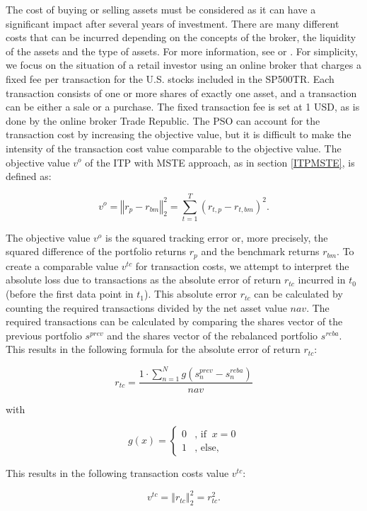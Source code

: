 \documentclass[
  oneside, a4paper, 12pt, openany]{book}
\theoremstyle{definition}
\theoremstyle{definition}
\theoremstyle{definition}
\theoremstyle{definition}
\theoremstyle{remark}
\begin{document}
The cost of buying or selling assets must be considered as it can have a significant impact after several years of investment. There are many different costs that can be incurred depending on the concepts of the broker, the liquidity of the assets and the type of assets. For more information, see \citep{AkGa2022} or \citep{NySe2022}. For simplicity, we focus on the situation of a retail investor using an online broker that charges a fixed fee per transaction for the U.S. stocks included in the SP500TR. Each transaction consists of one or more shares of exactly one asset, and a transaction can be either a sale or a purchase. The fixed transaction fee is set at 1 USD, as is done by the online broker Trade Republic. The PSO can account for the transaction cost by increasing the objective value, but it is difficult to make the intensity of the transaction cost value comparable to the objective value. The objective value \(v^o\) of the ITP with MSTE approach, as in section \ref{ITPMSTE}, is defined as:

\[
 v^o = \left\Vert r_{p}-r_{bm} \right\Vert_2^2 = \sum_{t=1}^T (r_{t,p}-r_{t,bm})^2.
\]

The objective value \(v^o\) is the squared tracking error or, more precisely, the squared difference of the portfolio returns \(r_p\) and the benchmark returns \(r_{bm}\). To create a comparable value \(v^{tc}\) for transaction costs, we attempt to interpret the absolute loss due to transactions as the absolute error of return \(r_{tc}\) incurred in \(t_0\) (before the first data point in \(t_1\)). This absolute error \(r_{tc}\) can be calculated by counting the required transactions divided by the net asset value \(nav\). The required transactions can be calculated by comparing the shares vector of the previous portfolio \(s^{prev}\) and the shares vector of the rebalanced portfolio \(s^{reba}\). This results in the following formula for the absolute error of return \(r_{tc}\):

\[
 r_{tc} = \frac{1 \cdot \sum_{n=1}^N g(s^{prev}_n-s^{reba}_n) }{nav}
\]

with

\[
  g(x) =    \begin{cases}
  0 &\text{, if }\ x = 0\\
  1 &\text{, else,}
  \end{cases}
\]

This results in the following transaction costs value \(v^{tc}\):

\[
v^{tc} = \left\Vert r_{tc} \right\Vert_2^2 = r_{tc}^2.
\]
\end{document}

